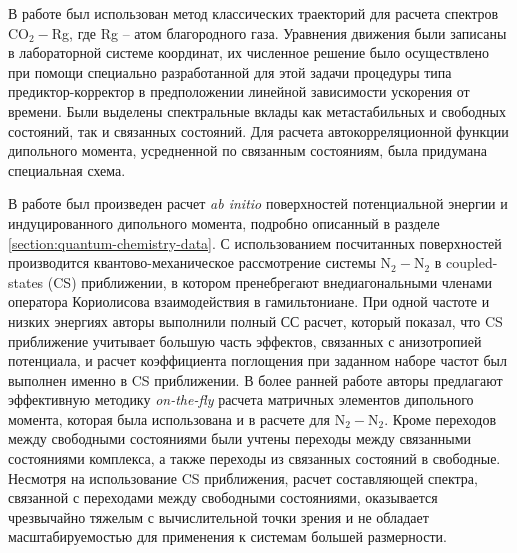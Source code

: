 В работе \cite{oparin2017} был использован метод классических траекторий для расчета спектров CO$_2-$Rg, где Rg -- атом благородного газа. Уравнения движения были записаны в лабораторной системе координат, их численное решение было осуществлено при помощи специально разработанной для этой задачи процедуры типа предиктор-корректор в предположении линейной зависимости ускорения от времени. Были выделены спектральные вклады как метастабильных и свободных состояний, так и связанных состояний. Для расчета автокорреляционной функции дипольного момента, усредненной по связанным состояниям, была придумана специальная схема. \par 
В работе \cite{karman2015} был произведен расчет \textit{ab initio} поверхностей потенциальной энергии и индуцированного дипольного момента, подробно описанный в разделе \ref{section:quantum-chemistry-data}. С использованием посчитанных поверхностей производится квантово-механическое рассмотрение системы N$_2-$N$_2$ в coupled-states (CS) приближении, в котором пренебрегают внедиагональными членами оператора Кориолисова взаимодействия в гамильтониане. При одной частоте и низких энергиях авторы выполнили полный СС расчет, который показал, что CS приближение учитывает большую часть эффектов, связанных с анизотропией потенциала, и расчет коэффициента поглощения при заданном наборе частот был выполнен именно в CS приближении. В более ранней работе \cite{karman2015_h2h2} авторы предлагают эффективную методику \textit{on-the-fly} расчета матричных элементов дипольного момента, которая была использована и в расчете для N$_2-$N$_2$. Кроме переходов между свободными состояниями были учтены переходы между связанными состояниями комплекса, а также переходы из связанных состояний в свободные. Несмотря на использование CS приближения, расчет составляющей спектра, связанной с переходами между свободными состояниями, оказывается чрезвычайно тяжелым с вычислительной точки зрения и не обладает масштабируемостью для применения к системам большей размерности. \par
